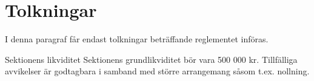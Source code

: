 \documentclass[pdfbookmarks,a4paper,11pt]{article}
\newlength{\itemcollength}
\newenvironment{reglemlista}{%
  \begin{list}{}{%
      \setlength{\labelwidth}{\itemcollength}%
      \setlength{\leftmargin}{\labelwidth + \labelsep}%
      \renewcommand{\makelabel}[1]{%
        \raisebox{0pt}[1ex][0pt]{%
          \makebox[\labelwidth][l]{%
            \parbox[t]{\itemcollength}{%
              \raggedright\hspace{0pt}##1}}}\hfill}%
      }}{%
  \end{list}}
\begin{document}
\section{Tolkningar}

I denna paragraf får endast tolkningar beträffande reglementet införas.

\begin{reglemlista}

	\item[Sektionens likviditet]
    	Sektionens grundlikviditet bör vara 500 000 kr. Tillfälliga avvikelser är godtagbara i samband med större arrangemang såsom t.ex. nollning.

\end{reglemlista}
\end{document}
